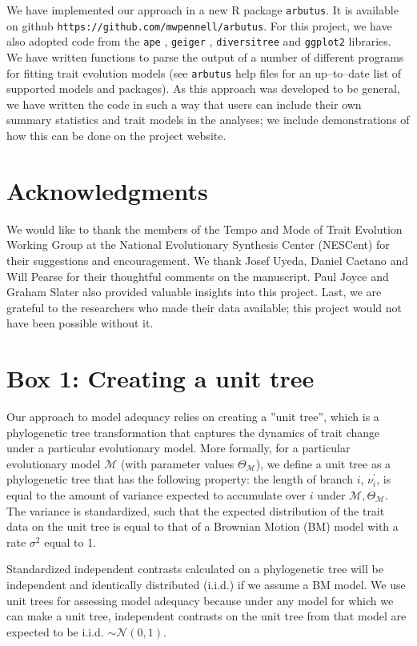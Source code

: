 \documentclass[a4paper,12pt]{article}
\begin{document}
We have implemented our approach in a new R package \texttt{arbutus}. It is available on github \texttt{https://github.com/mwpennell/arbutus}. For this project, we have also adopted code from the \texttt{ape} \citep{ape}, \texttt{geiger} \citep{geiger2}, \texttt{diversitree} \citep{FitzJohn2012} and \texttt{ggplot2} \citep{ggplot2} libraries. We have written functions to parse the output of a number of different programs for fitting trait evolution models (see \texttt{arbutus} help files for an up--to--date list of supported models and packages). As this approach was developed to be general, we have written the code in such a way that users can include their own summary statistics and trait models in the analyses; we include demonstrations of how this can be done on the project website.

\section{Acknowledgments}
We would like to thank the members of the Tempo and Mode of Trait Evolution Working Group at the National Evolutionary Synthesis Center (NESCent) for their suggestions and encouragement. We thank Josef Uyeda, Daniel Caetano and Will Pearse for their thoughtful comments on the manuscript. Paul Joyce and Graham Slater also provided valuable insights into this project. Last, we are grateful to the researchers who made their data available; this project would not have been possible without it.

\newpage
\section{Box 1: Creating a unit tree}

Our approach to model adequacy relies on creating a ''unit tree'', which is a phylogenetic tree transformation that captures the dynamics of trait change under a particular evolutionary model. More formally, for a particular evolutionary model $\mathcal{M}$ (with parameter values $\Theta_{\mathcal{M}}$), we define a unit tree as a phylogenetic tree that has the following property: the length of branch $i$, $\nu_i ^\prime$, is equal to the amount of variance expected to accumulate over $i$ under $\mathcal{M}, \Theta_{\mathcal{M}}$. The variance is standardized, such that the expected distribution of the trait data on the unit tree is equal to that of a Brownian Motion (BM) model with a rate $\sigma^2$ equal to 1. 

Standardized independent contrasts calculated on a phylogenetic tree will be independent and identically distributed (i.i.d.) if we assume a BM model. We use unit trees for assessing model adequacy because under any model for which we can make a unit tree, independent contrasts on the unit tree from that model are expected to be i.i.d. $\sim \mathcal{N}(0,1)$.
\end{document}
